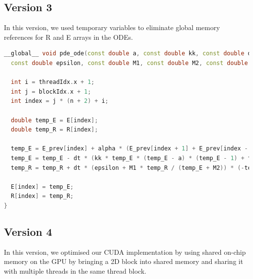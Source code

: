 \documentclass{article}
\newcommand\tab[1][0.5cm]{\hspace*{#1}}
\begin{document}
\subsection{Version 3}
\tab In this version, we used temporary variables to eliminate global memory references for R and E arrays in the ODEs.

\begin{lstlisting}[language=C++]
__global__ void pde_ode(const double a, const double kk, const double dt, const int n, const int m, double *E, double *E_prev, double *R, 
  const double epsilon, const double M1, const double M2, const double b, const double alpha) {
  
  int i = threadIdx.x + 1;
  int j = blockIdx.x + 1;
  int index = j * (n + 2) + i;

  double temp_E = E[index]; 
  double temp_R = R[index];
   
  temp_E = E_prev[index] + alpha * (E_prev[index + 1] + E_prev[index - 1] - 4 * E_prev[index] + E_prev[index + m + 2] + E_prev[index - (m + 2)]);
  temp_E = temp_E - dt * (kk * temp_E * (temp_E - a) * (temp_E - 1) + temp_E * temp_R);
  temp_R = temp_R + dt * (epsilon + M1 * temp_R / (temp_E + M2)) * (-temp_R - kk * temp_E * (temp_E - b - 1));

  E[index] = temp_E;
  R[index] = temp_R;
}
\end{lstlisting}

\newpage

\subsection{Version 4}
\tab In this version, we optimised our CUDA implementation by using shared on-chip memory on the GPU by bringing a 2D block into shared memory and sharing it with multiple threads in the same thread block.
\end{document}
